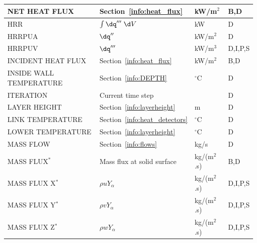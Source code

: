 \documentclass[11pt]{book}
\begin{document}
\begin{longtable}{@{\extracolsep{\fill}}|l|l|l|l|}
{\ct NET HEAT FLUX}                             & Section~\ref{info:heat_flux}                  & kW/m$^2$       & B,D          \\ \hline
{\ct HRR}                                       & $\int \dq''' \; \d V$                         & kW             & D            \\ \hline
{\ct HRRPUA}                                    & $\dq''$                                       & kW/m$^2$       & D            \\ \hline
{\ct HRRPUV}                                    & $\dq'''$                                      & kW/m$^3$       & D,I,P,S      \\ \hline
{\ct INCIDENT HEAT FLUX}                        & Section~\ref{info:heat_flux}                  & kW/m$^2$       & B,D          \\ \hline
{\ct INSIDE WALL TEMPERATURE}                   & Section~\ref{info:DEPTH}                      & $^\circ$C      & D            \\ \hline
{\ct ITERATION}                                 & Current time step                             &                & D            \\ \hline
{\ct LAYER HEIGHT}                              & Section~\ref{info:layerheight}                & m              & D            \\ \hline
{\ct LINK TEMPERATURE}                          & Section~\ref{info:heat_detectors}             & $^\circ$C      & D            \\ \hline
{\ct LOWER TEMPERATURE}                         & Section~\ref{info:layerheight}                & $^\circ$C      & D            \\ \hline
{\ct MASS FLOW}                                 & Section~\ref{info:flows}                      & kg/s           & D            \\ \hline
{\ct MASS FLUX}$^*$                             & Mass flux at solid surface                    & \si{kg/(m$^2$.s)} & B,D          \\ \hline
{\ct MASS FLUX X}$^*$                           & $\rho u Y_\alpha$                             & \si{kg/(m$^2$.s)} & D,I,P,S      \\ \hline
{\ct MASS FLUX Y}$^*$                           & $\rho v Y_\alpha$                             & \si{kg/(m$^2$.s)} & D,I,P,S      \\ \hline
{\ct MASS FLUX Z}$^*$                           & $\rho w Y_\alpha$                             & \si{kg/(m$^2$.s)} & D,I,P,S      \\ \hline

\end{longtable}
\end{document}
